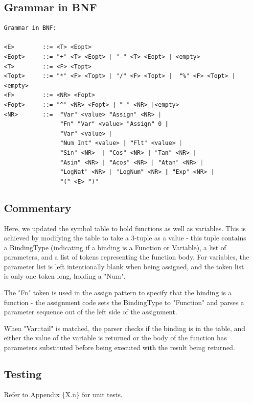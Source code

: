 \documentclass[a4paper, oneside, 11pt]{report}
\begin{document}
    \subsection{Grammar in BNF}
    \begin{verbatim}
Grammar in BNF:

<E>        ::= <T> <Eopt>
<Eopt>     ::= "+" <T> <Eopt> | "-" <T> <Eopt> | <empty>
<T>        ::= <F> <Topt>
<Topt>     ::= "*" <F> <Topt> | "/" <F> <Topt> |  "%" <F> <Topt> |<empty>
<F>        ::= <NR> <Fopt>
<Fopt>     ::= "^" <NR> <Fopt> | "-" <NR> |<empty>
<NR>       ::=  "Var" <value> "Assign" <NR> |
                "Fn" "Var" <value> "Assign" 0 |
                "Var" <value> |
                "Num Int" <value> | "Flt" <value> |
                "Sin" <NR>  | "Cos" <NR> | "Tan" <NR> |
                "Asin" <NR> | "Acos" <NR> | "Atan" <NR> |
                "LogNat" <NR> | "LogNum" <NR> | "Exp" <NR> |
                "(" <E> ")"
    \end{verbatim}

    \subsection{Commentary}
    Here, we updated the symbol table to hold functions as well as variables. This is achieved by modifying the table to take a 3-tuple as a value - this tuple contains a BindingType (indicating if a binding is a Function or Variable), a list of parameters, and a list of tokens representing the function body. For variables, the parameter list is left intentionally blank when being assigned, and the token list is only one token long, holding a "Num".

    The "Fn" token is used in the assign pattern to specify that the binding is a function - the assignment code sets the BindingType to "Function" and parses a parameter sequence out of the left side of the assignment.

    When "Var::tail" is matched, the parser checks if the binding is in the table, and either the value of the variable is returned or the body of the function has parameters substituted before being executed with the result being returned.

    \subsection{Testing}
    Refer to Appendix \{X.n\} for unit tests.

    \clearpage
\end{document}
